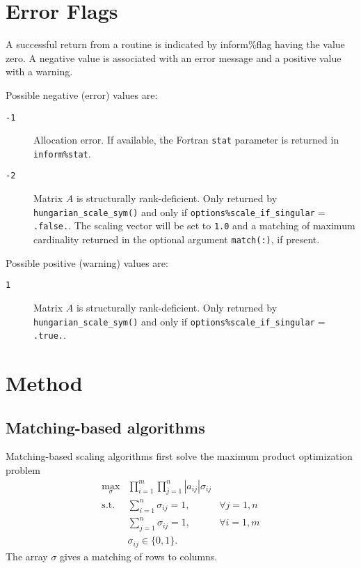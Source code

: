 
\section{Error Flags} \label{error flags}
A successful return from a routine is indicated by inform\%flag having the value zero. A negative value is associated with an error message and a positive value with a warning.

Possible negative (error) values are:
\begin{description}
\item[\texttt{-1}] Allocation error. If available, the Fortran \texttt{stat} parameter is returned in \texttt{inform\%stat}.
\item[\texttt{-2}] Matrix $A$ is structurally rank-deficient. Only returned by \texttt{hungarian\_scale\_sym()} and only if \texttt{options\%scale\_if\_singular}$=$\texttt{.false.}. The scaling vector will be set to \texttt{1.0} and a matching of maximum cardinality returned in the optional argument \texttt{match(:)}, if present.
\end{description}

Possible positive (warning) values are:
\begin{description}
\item[\texttt{1}] Matrix $A$ is structurally rank-deficient. Only returned by \texttt{hungarian\_scale\_sym()} and only if \texttt{options\%scale\_if\_singular}$=$\texttt{.true.}.
\end{description}


\section{Method} \label{method}

\subsection{Matching-based algorithms}

Matching-based scaling algorithms first solve the maximum product optimization
problem
\begin{eqnarray*}
   \max_{\sigma} & \prod_{i=1}^m\prod_{j=1}^n |a_{ij}|\sigma_{ij} & \\
   \mathrm{s.t.} & \sum_{i=1}^n\sigma_{ij} = 1, & \forall j=1,n \\
                 & \sum_{j=1}^n\sigma_{ij} = 1, & \forall i=1,m \\
                 & \sigma_{ij} \in \{0,1\}.
\end{eqnarray*}
The array $\sigma$ gives a matching of rows to columns.

